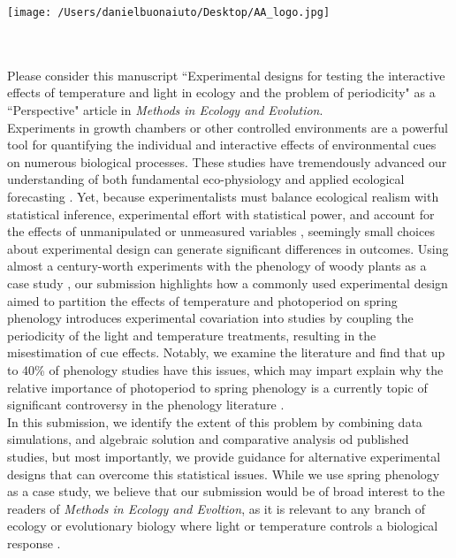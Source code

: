 \documentclass[11.5 pt]{article}
\begin{document}


\def\labelitemi{--}
\parindent=24pt
\noindent\texttt{[image: /Users/danielbuonaiuto/Desktop/AA\_logo.jpg]}
\\\\
\\
\vspace{1.5ex}

\noindent Please consider this manuscript ``Experimental designs for testing the interactive effects of temperature and light in ecology and the problem of periodicity" as a ``Perspective" article in \textit{Methods in Ecology and Evolution}.\\

\noindent Experiments in growth chambers or other controlled environments are a powerful tool for quantifying the individual and interactive effects of environmental cues on numerous biological processes. These studies have tremendously advanced our understanding of both fundamental eco-physiology and applied ecological forecasting \citep{Osmond:2004wb}. Yet, because experimentalists must balance ecological realism with statistical inference, experimental effort with statistical power, and account for the effects of unmanipulated or unmeasured variables \citep{schneiner2001}, seemingly small choices about experimental design can generate significant differences in outcomes. Using almost a century-worth experiments with the phenology of woody plants as a case study \citep{wolkovich2019}, our submission highlights how a commonly used experimental design aimed to partition the effects of temperature and photoperiod on spring phenology introduces experimental covariation into studies by coupling the periodicity of the light and temperature treatments, resulting in the misestimation of cue effects. Notably, we examine the literature and find that up to 40\% of phenology studies have this issues, which may impart explain why the relative importance of photoperiod to spring phenology is a currently topic of significant controversy in the phenology literature \citep{Zohner:2016uz,WAY:2015aa}. \\

\noindent In this submission, we identify the extent of this problem by combining data simulations, and algebraic solution and comparative analysis od published studies, but most importantly, we provide guidance for alternative experimental designs that can overcome this statistical issues. While we use spring phenology as a case study, we believe that our submission would be of broad interest to the readers of \textit{Methods in Ecology and Evoltion}, as it is relevant to any branch of ecology or evolutionary biology where light or temperature controls a biological response \citep[e.g.,][]{Franklin:2009wo,Brown:2014vn,Casal:2018us}.\\
\end{document}
